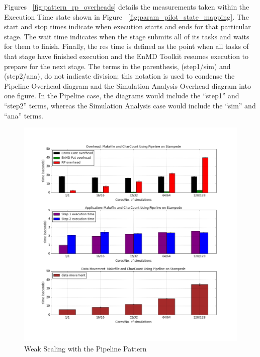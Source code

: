 \documentclass[]{article}
\begin{document}

		Figures ~\ref{fig:pattern_rp_overheads} details the measurements taken within the Execution Time state shown in Figure ~\ref{fig:param_pilot_state_mapping}. The start and stop times indicate when execution starts and ends for that particular stage. The wait time indicates when the stage submits all of its tasks and waits for them to finish. Finally, the res time is defined as the point when all tasks of that stage have finished execution and the EnMD Toolkit resumes execution to prepare for the next stage. The terms in the parenthesis, (step1/sim) and (step2/ana), do not indicate division; this notation is used to condense the Pipeline Overhead diagram and the Simulation Analysis Overhead diagram into one figure. In the Pipeline case, the diagrams would include the ``step1'' and ``step2'' terms, whereas the Simulation Analysis case would include the ``sim'' and ``ana'' terms.

		\begin{figure}[H]
			\centering
			\includegraphics[scale=.30]{img/pipeline_weak_scaling.png}
			\caption{Weak Scaling with the Pipeline Pattern}
			\label{fig:pipeline_weak_scaling}
		\end{figure}
\end{document}
